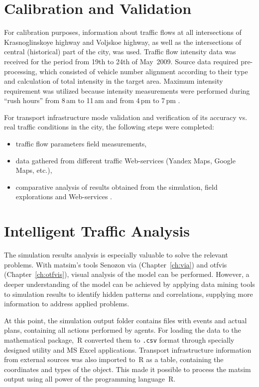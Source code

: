 \section{Calibration and Validation}
For calibration purposes, information about traffic flows at all intersections of Krasnoglinskoye highway and Voljskoe highway, as well as the intersections of central (historical) part of the city, was used. Traffic flow intensity data was received for the period from 19th to 24th of May~2009. Source data required pre-processing, which consisted of vehicle number alignment  according to their type and calculation of total intensity in the target area. Maximum intensity requirement was utilized because intensity measurements were performed during ``rush hours'' from 8\,am to 11\,am and from 4\,pm to 7\,pm \citep[][]{Mikheeva_2008}. 

For transport infrastructure mode validation and verification of its accuracy vs. real traffic conditions in the city, the following steps were completed: 
\begin{itemize}
\item traffic flow parameters field measurements,
\item data gathered from different traffic Web-services (Yandex Maps, Google Maps, etc.),
\item comparative analysis of results obtained from the simulation, field explorations and Web-services \citep[][]{SaprykinaEtAl_2014}.
\end{itemize}

\section{Intelligent Traffic Analysis}
 The simulation results analysis is especially valuable to solve the relevant problems. 
With \gls{matsim}'s tools Senozon \gls{via} (Chapter~\ref{ch:via}) and \gls{otfvis} (Chapter~\ref{ch:otfvis}), visual analysis of the model can be performed. 
However, a deeper understanding of the model can be achieved by applying data mining tools to simulation results to 
identify hidden patterns and correlations, supplying more information to address applied problems. 

At this point, the simulation output folder contains files with events and actual plans, containing all actions performed by agents. For loading the data to the mathematical package,~R converted them to \lstinline|.csv| format through specially designed utility and MS Excel applications. Transport infrastructure information from external sources was also imported to~R as a table, containing the coordinates and types of the object. This made it possible to process the \gls{matsim} output using all power of the programming language~R.

